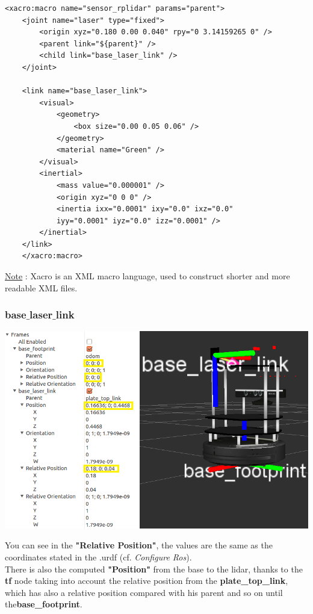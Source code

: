 \documentclass[10pt,a4paper]{article}
\begin{document}
\begin{lstlisting}[frame=single] 
	<xacro:macro name="sensor_rplidar" params="parent">
  	<joint name="laser" type="fixed">
		<origin xyz="0.180 0.00 0.040" rpy="0 3.14159265 0" />
		<parent link="${parent}" />
		<child link="base_laser_link" />
	</joint>

	<link name="base_laser_link">
		<visual>
			<geometry>
				<box size="0.00 0.05 0.06" />
			</geometry>
			<material name="Green" />
		</visual>
		<inertial>
			<mass value="0.000001" />
			<origin xyz="0 0 0" />
			<inertia ixx="0.0001" ixy="0.0" ixz="0.0"
			iyy="0.0001" iyz="0.0" izz="0.0001" />
		</inertial>
	</link>
	</xacro:macro>
\end{lstlisting}
\underline{Note} : Xacro is an XML macro language, used to construct shorter and more readable XML files.

\subsubsection{base$\_$laser$\_$link} 
\begin{center}
\includegraphics[width=\textwidth]{images/tf_coordinates_small.png}\\
\end{center}

You can see in the \textbf{"Relative Position"}, the values are the same as the coordinates stated in the .urdf (cf. \textit{Configure Ros}).\\
There is also the computed \textbf{"Position"} from the base to the lidar, thanks to the \textbf{tf} node taking into account the relative position from the \textbf{plate\_top\_link}, which has also a relative position compared with his parent and so on until the\textbf{base\_footprint}. \\
\end{document}

